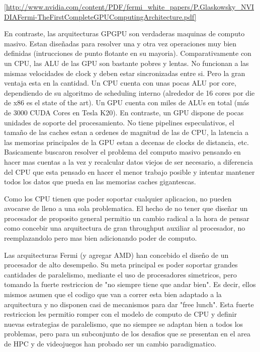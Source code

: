 \ref{http://www.nvidia.com/content/PDF/fermi_white_papers/P.Glaskowsky_NVIDIAFermi-TheFirstCompleteGPUComputingArchitecture.pdf}

En contraste, las arquitecturas GPGPU son verdaderas maquinas de computo masivo. Estan dise\~nadas para
resolver una y otra vez operaciones muy bien definidas (intrucciones de punto flotante en su mayoria).
Comparativamente con un CPU, las ALU de las GPU son bastante pobres y lentas. No funcionan a las mismas 
velocidades de clock y deben estar sincronizadas entre si. Pero la gran ventaja esta en la cantidad. 
Un CPU cuenta con unas pocas ALU por core, dependiendo de su algoritmo de scheduling interno 
(alrededor de 16 cores por die de x86 es el state of the art). Un GPU cuenta con miles de ALUs en total 
(m\'as de 3000 CUDA Cores en Tesla K20). En contraste, un GPU dispone 
de pocas unidades de soporte del procesamiento. No tiene pipelines especulativos, el tama\~no de las caches
estan a ordenes de magnitud de las de CPU, la latencia a las memorias principales de la GPU estan a 
decenas de clocks de distancia, etc. Basicamente buscaron resolver el problema del computo masivo pensando
en hacer mas cuentas a la vez y recalcular datos viejos de ser necesario, a diferencia del CPU que esta
pensado en hacer el menor trabajo posible y intentar mantener todos los datos que pueda en las memorias caches
gigantescas.
 
Como los CPU tienen que poder soportar cualquier aplicacion, no pueden avocarse de lleno a una sola
problematica. El hecho de no tener que dise\~nar un procesador de proposito general permitio un cambio radical
a la hora de pensar como concebir una arquitectura de gran throughput auxiliar al procesador, no reemplazandolo
pero mas bien adicionando poder de computo.

Las arquitecturas Fermi (y agregar AMD) han concebido el dise\~no de un procesador de alto desempe\~no. 
Su meta principal es poder soportar grandes cantidades de paralelismo, mediante el uso de procesadores
simetricos, pero tomando la fuerte restriccion de "no siempre tiene que andar bien". Es decir, ellos
mismos asumen que el codigo que van a correr esta bien adaptado a la arquitectura y no disponen
casi de mecanismos para dar "free lunch". Esta fuerte restriccion les permitio romper con el modelo
de computo de CPU y definir nuevas estrategias de paralelismo, que no siempre se adaptan bien a todos
los problemas, pero para un subconjunto de los desafios que se presentan en el area de HPC y de videojuegos
han probado ser un cambio paradigmatico.

